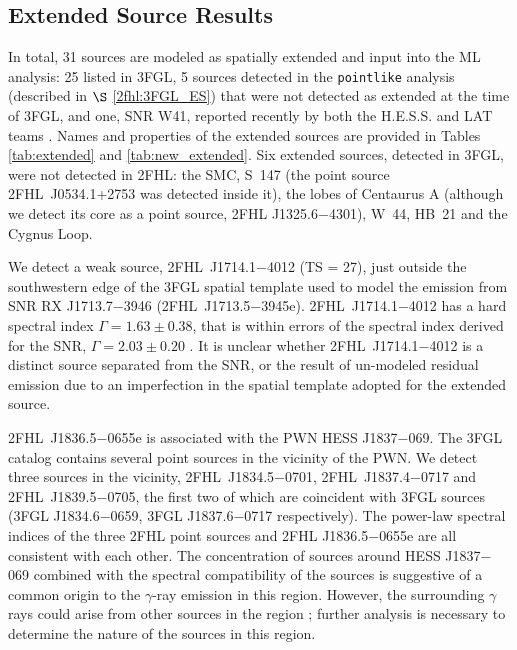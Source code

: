 %
%

\subsection{\label{2fhl:ESresults}Extended Source Results}


In total, 31 sources are modeled as spatially extended and input into the ML analysis: 25 listed in 3FGL, 5 sources detected in the {\tt pointlike} analysis (described in $\S$ \ref{2fhl:3FGL_ES}) that were not { detected as extended at the time of} 3FGL, and one, SNR W41, reported  recently by both the H.E.S.S. and LAT teams \citep{HESSLATW41}. Names and properties of the extended sources  are provided in Tables \ref{tab:extended} and \ref{tab:new_extended}. 
Six extended sources, detected in 3FGL, were not detected in 2FHL: the SMC, S~147 ({the point source 2FHL~J0534.1+2753 was detected inside it}), the lobes of Centaurus A (although we detect its core as a point source, 2FHL J1325.6$-$4301), W~44, HB~21 and the Cygnus Loop.

We detect a weak source, 2FHL~J1714.1$-$4012 (TS = 27), just outside the southwestern edge of the 3FGL spatial template used to model the emission from SNR RX J1713.7$-$3946 (2FHL~J1713.5$-$3945e). 2FHL~J1714.1$-$4012 has a hard spectral index $\Gamma = 1.63 \pm 0.38$, that is within errors of the spectral index derived for the SNR, $\Gamma = 2.03 \pm 0.20$ \citep{Abdo11-RXJ1713}. It is unclear whether 2FHL~J1714.1$-$4012 is a distinct source separated from the SNR, or the result of un-modeled residual emission due to an imperfection in the spatial template adopted for the extended source.


2FHL~J1836.5$-$0655e is associated with the PWN HESS J1837$-$069. The 3FGL catalog contains  several point sources in the vicinity of the PWN. We detect three sources in the vicinity, 2FHL~J1834.5$-$0701, 2FHL~J1837.4$-$0717 and 2FHL~J1839.5$-$0705, the first two of which are coincident with 3FGL sources (3FGL J1834.6$-$0659, 3FGL J1837.6$-$0717 respectively). The power-law spectral indices of the three 2FHL point sources and 2FHL J1836.5$-$0655e are all consistent with each other. The concentration of sources around HESS J1837$-$069 combined with the spectral compatibility of the sources is suggestive of a common origin to the $\gamma$-ray emission in this region. However, the surrounding $\gamma$ rays could arise from other sources in the region \citep{Gotthelf08}; further analysis is necessary to determine the nature of the sources in this region. 

